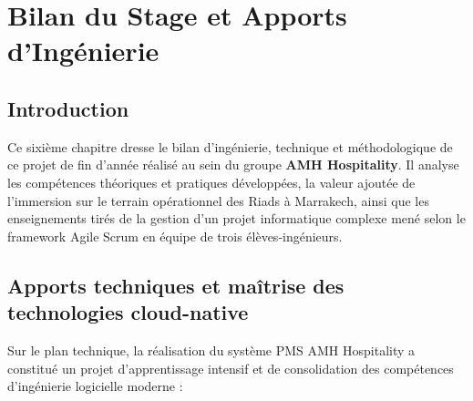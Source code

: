 \documentclass[12pt,a4paper,oneside]{report}
\begin{document}
\chapter{Bilan du Stage et Apports d'Ingénierie}
\label{chap:bilan}

\section{Introduction}

Ce sixième chapitre dresse le bilan d'ingénierie, technique et méthodologique de ce projet de fin d'année réalisé au sein du groupe \textbf{AMH Hospitality}. Il analyse les compétences théoriques et pratiques développées, la valeur ajoutée de l'immersion sur le terrain opérationnel des Riads à Marrakech, ainsi que les enseignements tirés de la gestion d'un projet informatique complexe mené selon le framework Agile Scrum en équipe de trois élèves-ingénieurs.

\section{Apports techniques et maîtrise des technologies cloud-native}

Sur le plan technique, la réalisation du système PMS AMH Hospitality a constitué un projet d'apprentissage intensif et de consolidation des compétences d'ingénierie logicielle moderne :
\end{document}
